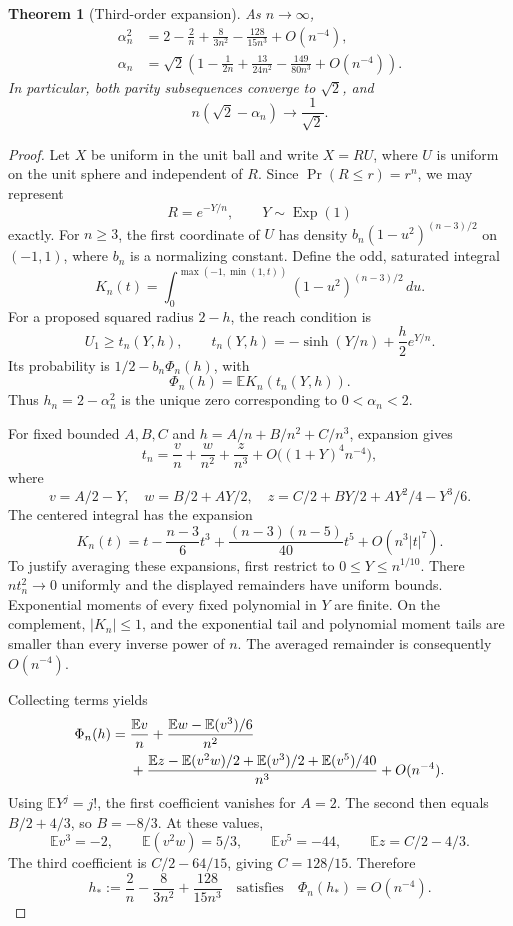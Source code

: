 \documentclass[11pt,a4paper]{article}
\numberwithin{equation}{section}
\newtheorem{theorem}{Theorem}[section]
\theoremstyle{definition}
\theoremstyle{remark}
\newcommand{\E}{\mathbb E}
\begin{document}
\begin{theorem}[Third-order expansion]\label{thm:asymptotic}
As $n\to\infty$,
\begin{align}
 \alpha_n^2&=2-\frac2n+\frac{8}{3n^2}-\frac{128}{15n^3}+O(n^{-4}),\label{eq:alpha-square-asympt}\\
 \alpha_n&=\sqrt2\left(1-\frac1{2n}+\frac{13}{24n^2}-\frac{149}{80n^3}+O(n^{-4})\right).\label{eq:alpha-asympt}
\end{align}
In particular, both parity subsequences converge to $\sqrt2$, and
\[
 n(\sqrt2-\alpha_n)\longrightarrow\frac1{\sqrt2}.
\]
\end{theorem}
\begin{proof}
Let $X$ be uniform in the unit ball and write $X=RU$, where $U$ is uniform on the unit sphere and independent of $R$. Since $\Pr(R\leq r)=r^n$, we may represent
\[
 R=e^{-Y/n},\qquad Y\sim\operatorname{Exp}(1)
\]
exactly. For $n\geq3$, the first coordinate of $U$ has density $b_n(1-u^2)^{(n-3)/2}$ on $(-1,1)$, where $b_n$ is a normalizing constant. Define the odd, saturated integral
\[
 K_n(t)=\int_0^{\max(-1,\min(1,t))}(1-u^2)^{(n-3)/2}\,du.
\]
For a proposed squared radius $2-h$, the reach condition is
\[
 U_1\geq t_n(Y,h),\qquad
 t_n(Y,h)=-\sinh(Y/n)+\frac h2e^{Y/n}.
\]
Its probability is $1/2-b_n\Phi_n(h)$, with
\[
 \Phi_n(h)=\E K_n(t_n(Y,h)).
\]
Thus $h_n=2-\alpha_n^2$ is the unique zero corresponding to $0<\alpha_n<2$.

For fixed bounded $A,B,C$ and $h=A/n+B/n^2+C/n^3$, expansion gives
\[
 t_n=\frac vn+\frac w{n^2}+\frac z{n^3}
 +O\bigl((1+Y)^4n^{-4}\bigr),
\]
where
\[
 v=A/2-Y,\quad w=B/2+AY/2,\quad
 z=C/2+BY/2+AY^2/4-Y^3/6.
\]
The centered integral has the expansion
\[
 K_n(t)=t-\frac{n-3}{6}t^3
 +\frac{(n-3)(n-5)}{40}t^5+O(n^3|t|^7).
\]
To justify averaging these expansions, first restrict to $0\leq Y\leq n^{1/10}$. There $n t_n^2\to0$ uniformly and the displayed remainders have uniform bounds. Exponential moments of every fixed polynomial in $Y$ are finite. On the complement, $|K_n|\leq1$, and the exponential tail and polynomial moment tails are smaller than every inverse power of $n$. The averaged remainder is consequently $O(n^{-4})$.

Collecting terms yields
\begin{align}\label{eq:phi-expansion}
 \Phi_n(h)={}&\frac{\E v}{n}
 +\frac{\E w-\E(v^3)/6}{n^2}\notag\\
 &+\frac{\E z-\E(v^2w)/2+\E(v^3)/2+\E(v^5)/40}{n^3}
 +O(n^{-4}).
\end{align}
Using $\E Y^j=j!$, the first coefficient vanishes for $A=2$. The second then equals $B/2+4/3$, so $B=-8/3$. At these values,
\[
 \E v^3=-2,\qquad \E(v^2w)=5/3,\qquad
 \E v^5=-44,\qquad \E z=C/2-4/3.
\]
The third coefficient is $C/2-64/15$, giving $C=128/15$. Therefore
\[
 h_*:=\frac2n-\frac8{3n^2}+\frac{128}{15n^3}
 \quad\text{satisfies}\quad \Phi_n(h_*)=O(n^{-4}).
\]


\end{proof}
\end{document}

